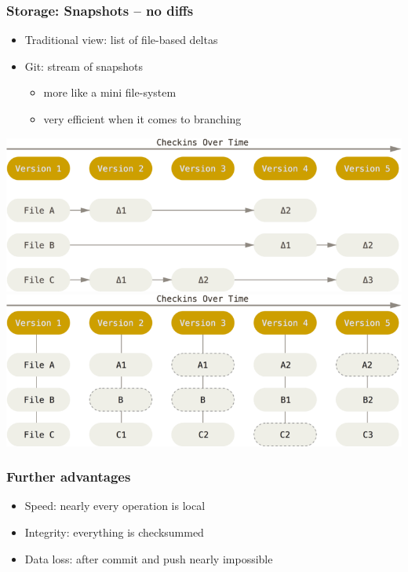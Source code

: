 \documentclass{beamer}
\begin{document}
\begin{frame}[fragile]
  \frametitle{Storage: Snapshots -- no diffs}
  \begin{itemize}
    \item<1-> Traditional view: list of file-based deltas
    \item<2->   Git: stream of snapshots
      \begin{itemize}
        \item more like a mini file-system
        \item very efficient when it comes to branching
      \end{itemize}
  \end{itemize}

  \centering
  \begin{overprint}
    \includegraphics[width=.9\textwidth]{deltas}
    \includegraphics[width=.9\textwidth]{snapshots}
  \end{overprint}
\end{frame}

\begin{frame}
  \frametitle{Further advantages}
  \begin{itemize}
    \item Speed: nearly every operation is local
    \item Integrity: everything is checksummed
    \item Data loss: after commit and push nearly impossible
  \end{itemize}
\end{frame}
\end{document}
